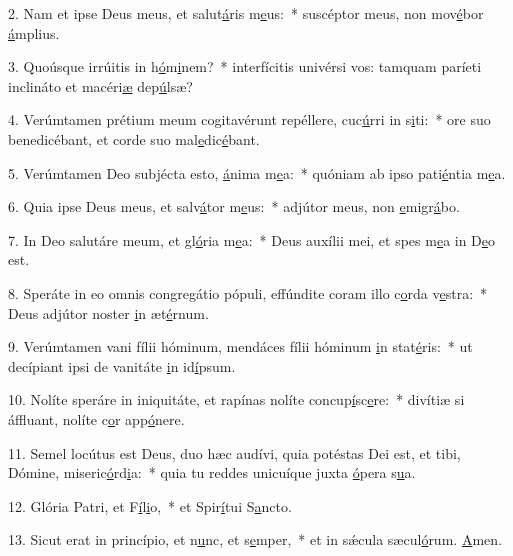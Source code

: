 2. Nam et ipse Deus meus, et salut\uline{á}ris m\uline{e}us:~* suscéptor meus, non mov\uline{é}bor \uline{á}mplius.\par 
3. Quoúsque irrúitis in h\uline{ó}m\uline{i}nem?~* interfícitis univérsi vos: tamquam paríeti inclináto et macéri\uline{æ} dep\uline{ú}lsæ?\par 
4. Verúmtamen prétium meum cogitavérunt repéllere, cuc\uline{ú}rri in s\uline{i}ti:~* ore suo benedicébant, et corde suo mal\uline{e}dic\uline{é}bant.\par 
5. Verúmtamen Deo subjécta esto, \uline{á}nima m\uline{e}a:~* quóniam ab ipso pati\uline{é}ntia m\uline{e}a.\par 
6. Quia ipse Deus meus, et salv\uline{á}tor m\uline{e}us:~* adjútor meus, non \uline{e}migr\uline{á}bo.\par 
7. In Deo salutáre meum, et gl\uline{ó}ria m\uline{e}a:~* Deus auxílii mei, et spes m\uline{e}a in D\uline{e}o est.\par 
8. Speráte in eo omnis congregátio pópuli, effúndite coram illo c\uline{o}rda v\uline{e}stra:~* Deus adjútor noster \uline{i}n æt\uline{é}rnum.\par 
9. Verúmtamen vani fílii hóminum, mendáces fílii hóminum \uline{i}n stat\uline{é}ris:~* ut decípiant ipsi de vanitáte \uline{i}n id\uline{í}psum.\par 
10. Nolíte speráre in iniquitáte, et rapínas nolíte concup\uline{í}sc\uline{e}re:~* divítiæ si áffluant, nolíte c\uline{o}r app\uline{ó}nere.\par 
11. Semel locútus est Deus, duo hæc audívi, quia potéstas Dei est, et tibi, Dómine, miseric\uline{ó}rd\uline{i}a:~* quia tu reddes unicuíque juxta \uline{ó}pera s\uline{u}a.\par 
12. Glória Patri, et F\uline{í}l\uline{i}o,~* et Spir\uline{í}tui S\uline{a}ncto.\par 
13. Sicut erat in princípio, et n\uline{u}nc, et s\uline{e}mper,~* et in sǽcula sæcul\uline{ó}rum. \uline{A}men.\par 
